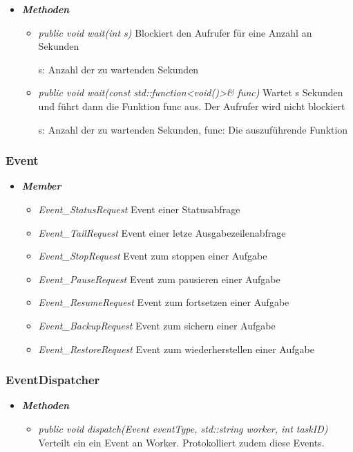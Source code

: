 \documentclass[a4paper,12pt]{article}
\begin{document}
\begin{itemize}[label={}]

	\item\textit{\textbf{Methoden}}
		\begin{itemize}[label={\textbullet}]
			\item\textit{public void wait(int s)} Blockiert den Aufrufer für eine Anzahl an Sekunden

s: Anzahl der zu wartenden Sekunden
			\item\textit{public void wait(const std::function<void()>\& func)} Wartet s Sekunden und führt dann die Funktion func aus.
Der Aufrufer wird nicht blockiert

s: Anzahl der zu wartenden Sekunden,
func: Die auszuführende Funktion
			
		\end{itemize}
\end{itemize}
\clearpage
\subsubsection{Event}

\begin{itemize}[label={}]
	\item\textit{\textbf{Member}}
		\begin{itemize}[label={\textbullet}]
			\item\textit{Event\_StatusRequest} Event einer Statusabfrage
			\item\textit{Event\_TailRequest} Event einer letze Ausgabezeilenabfrage
			\item\textit{Event\_StopRequest} Event zum stoppen einer Aufgabe
			\item\textit{Event\_PauseRequest} Event zum pausieren einer Aufgabe
			\item\textit{Event\_ResumeRequest} Event zum fortsetzen einer Aufgabe
			\item\textit{Event\_BackupRequest} Event zum sichern einer Aufgabe
			\item\textit{Event\_RestoreRequest} Event zum wiederherstellen einer Aufgabe
		\end{itemize}
\end{itemize}

\subsubsection{EventDispatcher}

\begin{itemize}[label={}]

	\item\textit{\textbf{Methoden}}
		\begin{itemize}[label={\textbullet}]
			\item\textit{public void dispatch(Event eventType, std::string worker, int taskID)} Verteilt ein ein Event an Worker. Protokolliert zudem diese Events.
			
		\end{itemize}
\end{itemize}
\end{document}

